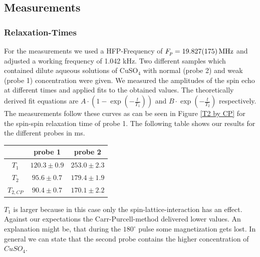 \documentclass[12pt, english]{scrartcl} %
\begin{document}
\begin{multicols}{2}
\subsection{Measurements}

\subsubsection{Relaxation-Times}

For the measurements we used a HFP-Frequency of $F_p=\SI{19.827\pm 0.175}{MHz}$ and adjusted a working frequency of 1.042 kHz. Two different samples which contained dilute aqueous solutions of CuSO$_4$ with normal (probe 2) and weak (probe 1) concentration were given. We measured the amplitudes of the spin echo at different times and applied fits to the obtained values. The theoretically derived fit equations are $A\cdot(1-\exp(-\frac{t}{T_1}))$ and $B\cdot \exp(-\frac{t}{T_2})$ respectively. The measurements follow these curves as can be seen in Figure \ref{T2 by CP} for the spin-spin relaxation time of probe 1. The following table shows our results for the different probes in ms.

\begin{center}
\begin{tabular}{|c|c|c|}
 \hline 
   & probe 1 & probe 2 \\ 
 \hline 
 $T_1$ & $120.3 \pm 0.9$ & $253.0 \pm 2.3$ \\ 
 \hline 
 $T_2$ & $95.6 \pm 0.7$ & $179.4 \pm 1.9$ \\ 
 \hline 
 $T_{2,CP}$ & $90.4\pm 0.7$ & $170.1 \pm 2.2$ \\ 
 \hline 
 \end{tabular}
 \end{center}
 
$T_1$ is larger because in this case only the spin-lattice-interaction has an effect.
Against our expectations the Carr-Purcell-method delivered lower values. An explanation might be, that during the $180^\circ$ pulse some magnetization gets lost. In general we can state that the second probe contains the higher concentration of $CuSO_4$. 



\end{multicols}
\end{document}

